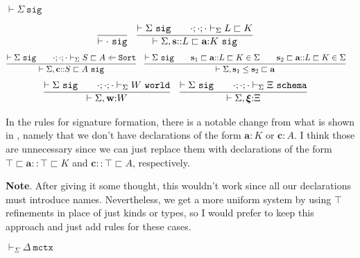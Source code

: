 \documentclass[letterpaper, 11pt]{article}
\newcommand{\Lar}{\Leftarrow}
\newcommand{\Sort}{\texttt{Sort}}
\newcommand{\world}{\texttt{world}}
\newcommand{\schema}{\texttt{schema}}
\newcommand{\mctx}{\texttt{mctx}}
\newcommand{\sig}{\texttt{sig}}
\begin{document}
    $\boxed{\vdash \Sigma \ \sig}$
    
    \begin{align*}
        & \infer{\vdash \cdot \ \sig}{} &
        & \infer{\vdash \Sigma, \textbf{s}{::}L \sqsubset \textbf{a} {:}  K \ \sig}
          {
            \vdash \Sigma \ \sig
            &&
            \cdot ; \cdot ; \cdot \vdash_\Sigma L \sqsubset K
          }
    \end{align*}
    \begin{align*}
        & \infer{\vdash \Sigma, \textbf{c} {::} S \sqsubset A \ \sig}
          {
            \vdash \Sigma \ \sig
            &&
            \cdot ; \cdot ; \cdot \vdash_\Sigma S \sqsubset A \Lar \Sort
          } &
        & \infer{\vdash \Sigma, \textbf{s}_1 \leq \textbf{s}_2 \sqsubset \textbf{a}}
          {
            \vdash \Sigma \ \sig
            &&
            \textbf{s}_1 \sqsubset \textbf{a} {::} L \sqsubset K \in \Sigma
            &&
            \textbf{s}_2 \sqsubset \textbf{a} {::} L \sqsubset K \in \Sigma
          }
    \end{align*}
    \begin{align*}
        & \infer{\vdash \Sigma , \textbf{w} {:} W}
          {
            \vdash \Sigma \ \sig
            &&
            \cdot ; \cdot ; \cdot \vdash_\Sigma W \ \world
          } &
        & \infer{\vdash \Sigma , \boldsymbol{\xi} {:} \Xi}
          {
            \vdash \Sigma \ \sig
            &&
            \cdot ; \cdot ; \cdot \vdash_\Sigma \Xi \ \schema
          } &
    \end{align*}

    In the rules for signature formation, there is a notable change from what is shown in \cite{LovasPfenning2010}, namely that we don't have
    declarations of the form $\textbf{a} {:} K$ or $\textbf{c} : A$.  I think those are unnecessary since we can just replace them with declarations
    of the form $\top \sqsubset \textbf{a} {::} \top \sqsubset K$ and $\textbf{c} {::} \top \sqsubset A$, respectively.

    \textbf{Note}.  After giving it some thought, this wouldn't work since all our declarations must introduce names.  Nevertheless, we get a more
    uniform system by using $\top$ refinements in place of just kinds or types, so I would prefer to keep this approach and just add rules for
    these cases.


    $\boxed{\vdash_\Sigma \Delta \ \mctx}$
\end{document}
